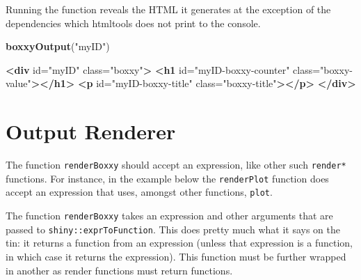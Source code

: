 \documentclass[10pt,]{krantz}
\makeatletter
\newenvironment{Shaded}{\begin{snugshade}}{\end{snugshade}}
\newcommand{\CommentTok}[1]{\textcolor[rgb]{0.37,0.37,0.37}{\textit{#1}}}
\newcommand{\KeywordTok}[1]{\textcolor[rgb]{0.27,0.27,0.27}{\textbf{#1}}}
\newcommand{\NormalTok}[1]{#1}
\newcommand{\OperatorTok}[1]{\textcolor[rgb]{0.43,0.43,0.43}{\textbf{#1}}}
\newcommand{\OtherTok}[1]{\textcolor[rgb]{0.37,0.37,0.37}{#1}}
\newcommand{\StringTok}[1]{\textcolor[rgb]{0.5,0.5,0.5}{#1}}
\newenvironment{kframe}{%
\medskip{}
\setlength{\fboxsep}{.8em}
 \def\at@end@of@kframe{}%
 \ifinner\ifhmode%
  \def\at@end@of@kframe{\end{minipage}}%
  \begin{minipage}{\columnwidth}%
 \fi\fi%
 \def\FrameCommand##1{\hskip\@totalleftmargin \hskip-\fboxsep
 \colorbox{shadecolor}{##1}\hskip-\fboxsep
     \hskip-\linewidth \hskip-\@totalleftmargin \hskip\columnwidth}%
 \MakeFramed {\advance\hsize-\width
   \@totalleftmargin\z@ \linewidth\hsize
   \@setminipage}}%
 {\par\unskip\endMakeFramed%
 \at@end@of@kframe}
\renewenvironment{Shaded}{\begin{kframe}}{\end{kframe}}
\makeatother
\begin{document}
Running the function reveals the HTML it generates at the exception of the dependencies which htmltools does not print to the console.

\begin{Shaded}
\begin{Highlighting}[]
\KeywordTok{boxxyOutput}\NormalTok{(}\StringTok{"myID"}\NormalTok{)}
\end{Highlighting}
\end{Shaded}

\begin{Shaded}
\begin{Highlighting}[]
\KeywordTok{<div}\OtherTok{ id=}\StringTok{"myID"}\OtherTok{ class=}\StringTok{"boxxy"}\KeywordTok{>}
  \KeywordTok{<h1}\OtherTok{ id=}\StringTok{"myID-boxxy-counter"}\OtherTok{ class=}\StringTok{"boxxy-value"}\KeywordTok{></h1>}
  \KeywordTok{<p}\OtherTok{ id=}\StringTok{"myID-boxxy-title"}\OtherTok{ class=}\StringTok{"boxxy-title"}\KeywordTok{></p>}
\KeywordTok{</div>}
\end{Highlighting}
\end{Shaded}

\hypertarget{shiny-output-renderer}{%
\section{Output Renderer}\label{shiny-output-renderer}}

The function \texttt{renderBoxxy} should accept an expression, like other such \texttt{render*} functions. For instance, in the example below the \texttt{renderPlot} function does accept an expression that uses, amongst other functions, \texttt{plot}.

\begin{Shaded}
\end{Shaded}

The function \texttt{renderBoxxy} takes an expression and other arguments that are passed to \texttt{shiny::exprToFunction}. This does pretty much what it says on the tin: it returns a function from an expression (unless that expression is a function, in which case it returns the expression). This function must be further wrapped in another as render functions must return functions.
\end{document}
